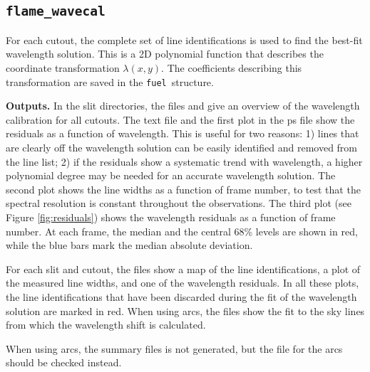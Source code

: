 \documentclass[a4paper]{article}
\newcommand{\fuel}{\texttt{fuel}}
\begin{document}
\begin{sloppypar}
\subsection{\texttt{flame\_wavecal}}
\label{sec:wavecal}

For each cutout, the complete set of line identifications is used to find the best-fit wavelength solution. This is a 2D polynomial function that describes the coordinate transformation $\lambda(x,y)$. The coefficients describing this transformation are saved in the \fuel\ structure.

\medskip
\noindent
\textbf{Outputs.} In the slit directories, the files  and   give an overview of the wavelength calibration for all cutouts. The text file and the first plot in the ps file show the residuals as a function of wavelength. This is useful for two reasons: 1) lines that are clearly off the wavelength solution can be easily identified and removed from the line list; 2) if the residuals show a systematic trend with wavelength, a higher polynomial degree may be needed for an accurate wavelength solution. The second plot shows the line widths as a function of frame number, to test that the spectral resolution is constant throughout the observations. The third plot (see Figure \ref{fig:residuals}) shows the wavelength residuals as a function of frame number. At each frame, the median and the central 68\% levels are shown in red, while the blue bars mark the median absolute deviation.

For each slit and cutout, the  files show a map of the line identifications, a plot of the measured line widths, and one of the wavelength residuals. In all these plots, the line identifications that have been discarded during the fit of the wavelength solution are marked in red. When using arcs, the  files show the fit to the sky lines from which the wavelength shift is calculated.

When using arcs, the summary files is not generated, but the  file for the arcs should be checked instead.


\end{sloppypar}
\end{document}
